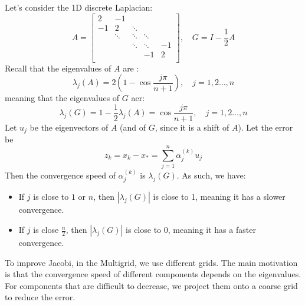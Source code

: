\documentclass[../main/main.tex]{subfiles}
\begin{document}
\begin{example}
  Let's consider the 1D discrete Laplacian:
  \[
  A = \begin{bmatrix}
    2&-1&&&\\
    -1&2&\ddots&&\\
    &\ddots&\ddots&\ddots&\\
    &&\ddots&\ddots&-1\\
    &&&-1&2\\
  \end{bmatrix}, \quad G = I-\frac{1}{2}A
\] Recall that the eigenvalues of $A$ are : \[
\lambda_{j}(A) = 2\left(1-\cos \frac{j\pi}{n+1} \right), \quad j=1,2 \ldots,n
\]
meaning that the eigenvalues of $G$ aer: \[
\lambda_{j}(G) = 1-\frac{1}{2}\lambda_{j}(A) = \cos \frac{j\pi}{n+1}, \quad j=1,2 \ldots,n
\]
Let $u_{j}$ be the eigenvectors of $A$ (and of $G$, since it is a shift of $A$). Let the error be \[
  z_{k} = x_{k}-x_{*} = \sum_{j=1}^n \alpha_{j}^{(k)}u_{j}
\] Then the convergence speed of $\alpha_{j}^{(k)}$ is $\lambda_{j}(G)$. As such, we have:
\begin{itemize}
\item
        If $j$ is close to $1$ or $n$, then $|\lambda_{j}(G)|$ is close to 1, meaning it has a slower convergence.

      \item If $j$ is close $\frac{n}{2}$, then $|\lambda_{j}(G)|$ is close to 0, meaning it has a faster convergence.
\end{itemize}
\end{example}
\begin{remark}
To improve Jacobi, in the Multigrid, we use different grids. The main motivation is that the convergence speed of different components depends on the eigenvalues. For components that are difficult to decrease, we project them onto a coarse grid to reduce the error.
\end{remark}
\end{document}
